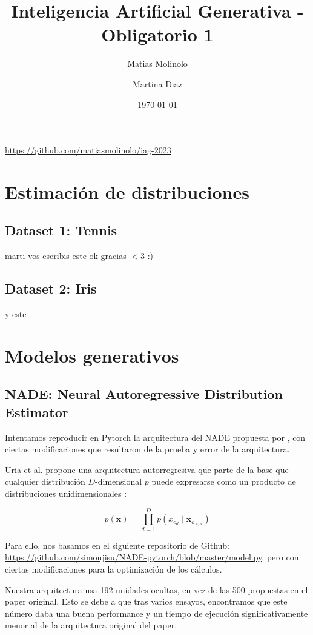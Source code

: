 \documentclass[11pt]{article}
\title{Inteligencia Artificial Generativa - Obligatorio 1}
\author{Matias Molinolo}
\author{Martina Diaz}
\affil{Facultad de Ingeniería, Universidad ORT Uruguay}
\date{\today}
\begin{document}
\maketitle
\begin{center}
    \url{https://github.com/matiasmolinolo/iag-2023}
\end{center}
\thispagestyle{empty}
\newpage
\tableofcontents
\newpage

\section{Estimación de distribuciones}

\subsection{Dataset 1: Tennis}
marti vos escribis este 
ok gracias $<$3
:)
\subsection{Dataset 2: Iris}
y este

\section{Modelos generativos}
\subsection{NADE: Neural Autoregressive Distribution Estimator}

Intentamos reproducir en Pytorch la arquitectura del NADE propuesta por \cite{nade}, con ciertas modificaciones que resultaron de la prueba y error de la arquitectura.

Uria et al. propone una arquitectura autorregresiva que parte de la base que cualquier distribución $D$-dimensional $p$ puede expresarse como un producto de distribuciones unidimensionales \cite{nade}:

$$
p(\boldsymbol{x}) = \prod_{d=1}^{D}p(x_{o_d} \mid \boldsymbol{x}_{o_{<d}})
$$

Para ello, nos basamos en el siguiente repositorio de Github: \url{https://github.com/simonjisu/NADE-pytorch/blob/master/model.py}, pero con ciertas modificaciones para la optimización de los cálculos.

Nuestra arquitectura usa 192 unidades ocultas, en vez de las 500 propuestas en el paper original. Esto se debe a que tras varios ensayos, encontramos que este número daba una buena performance y un tiempo de ejecución significativamente menor al de la arquitectura original del paper. 
\end{document}

